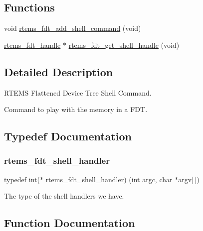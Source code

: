 \subsection*{Functions}
\begin{DoxyCompactItemize}
\item 
void \mbox{\hyperlink{rtems-fdt-shell_8c_abb37bd70380bdbe1fb1f45db28fad2b0}{rtems\+\_\+fdt\+\_\+add\+\_\+shell\+\_\+command}} (void)
\item 
\mbox{\hyperlink{structrtems__fdt__handle}{rtems\+\_\+fdt\+\_\+handle}} $\ast$ \mbox{\hyperlink{rtems-fdt-shell_8c_a60aacc9efa15224a053dc5c51f1cbd4b}{rtems\+\_\+fdt\+\_\+get\+\_\+shell\+\_\+handle}} (void)
\end{DoxyCompactItemize}


\subsection{Detailed Description}
R\+T\+E\+MS Flattened Device Tree Shell Command. 

Command to play with the memory in a F\+DT. 

\subsection{Typedef Documentation}
\mbox{\label{rtems-fdt-shell_8c_a0189fbb9d9f8d895a991ff4e73cea6a8}} 
\subsubsection{\texorpdfstring{rtems\_fdt\_shell\_handler}{rtems\_fdt\_shell\_handler}}
{\footnotesize\ttfamily typedef int($\ast$ rtems\+\_\+fdt\+\_\+shell\+\_\+handler) (int argc, char $\ast$argv\mbox{[}$\,$\mbox{]})}

The type of the shell handlers we have. 

\subsection{Function Documentation}
\mbox{\label{rtems-fdt-shell_8c_abb37bd70380bdbe1fb1f45db28fad2b0}} 
